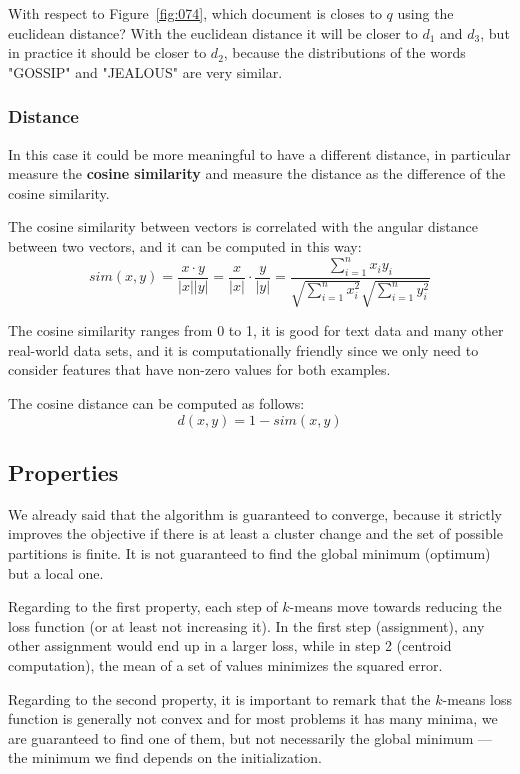 With respect to Figure~\ref{fig:074}, which document is closes to \(q\) using the euclidean distance? With the euclidean distance it will be closer to \(d_1\) and \(d_3\), but in practice it should be closer to \(d_2\), because the distributions of the words "GOSSIP" and "JEALOUS" are very similar.

\subsubsection{Distance}
In this case it could be more meaningful to have a different distance, in particular measure the \textbf{cosine similarity} and measure the distance as the difference of the cosine similarity.

The cosine similarity between vectors is correlated with the angular distance between two vectors, and it can be computed in this way:
\begin{equation}
    sim(x,y) = \frac {x \cdot y} {|x||y|} = \frac x {|x|} \cdot \frac y {|y|} = \frac {\sum_{i=1}^n x_iy_i} {\sqrt{\sum_{i=1}^n x_i^2} \sqrt{\sum_{i=1}^n y_i^2}}
\end{equation}

The cosine similarity ranges from 0 to 1, it is good for text data and many other real-world data sets, and it is computationally friendly since we only need to consider features that have non-zero values for both examples.

The cosine distance can be computed as follows:
\begin{equation}
    d(x,y) = 1 - sim(x,y)
\end{equation}

\subsection{Properties}
We already said that the algorithm is guaranteed to converge, because it strictly improves the objective if there is at least a cluster change and the set of possible partitions is finite. It is not guaranteed to find the global minimum (optimum) but a local one.

Regarding to the first property, each step of \(k\)-means move towards reducing the loss function (or at least not increasing it). In the first step (assignment), any other assignment would end up in a larger loss, while in step 2 (centroid computation), the mean of a set of values minimizes the squared error.

Regarding to the second property, it is important to remark that the \(k\)-means loss function is generally not convex and for most problems it has many minima, we are guaranteed to find one of them, but not necessarily the global minimum --- the minimum we find depends on the initialization.

